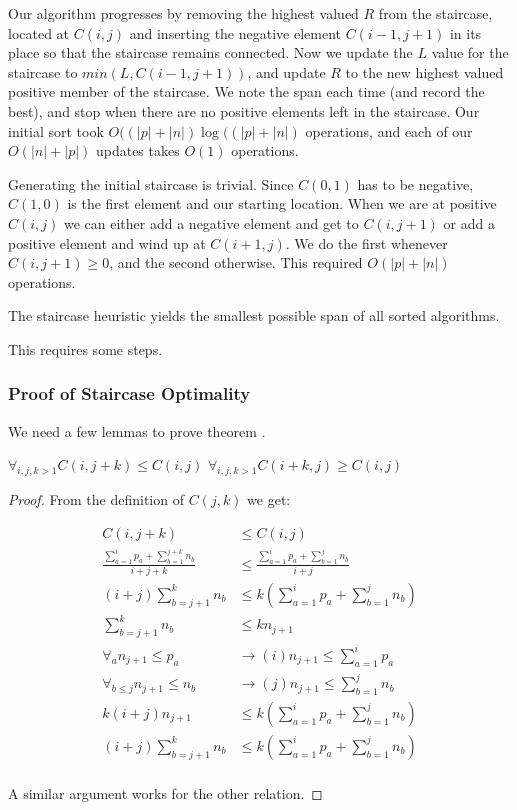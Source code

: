 \documentclass[11pt,twocolumn]{article}
\begin{document}
Our algorithm progresses by removing the highest valued $R$ from the staircase, located at $C(i,j)$ and inserting the negative element $C(i-1,j+1)$ in its place so that the staircase remains connected.  Now we update the $L$ value for the staircase to $min(L,C(i-1,j+1) )$, and update $R$ to the new highest valued positive member of the staircase. We note the span each time (and record the best), and stop when there are no positive elements left in the staircase.  Our initial sort took $O( (|p|+|n|) \log ((|p|+|n| )$ operations, and each of our $O(|n|+|p|)$ updates takes $O(1)$ operations.

Generating the initial staircase is trivial. Since $C(0,1)$ has to be negative, $C(1,0)$ is the first element and our starting location.  When we are at positive $C(i,j)$ we can either add a negative element and get to $C(i,j+1)$ or add a positive element and wind up at $C(i+1,j)$. We do the first whenever $C(i,j+1) \geq 0$, and the second otherwise. This required $O(|p|+ |n|)$ operations.

\begin{thm}  \label{thm:staircaseIsOpt}
The staircase heuristic yields the smallest possible span of all sorted algorithms.
\end{thm}

This requires some steps.

\subsubsection{Proof of Staircase Optimality}

We need a few lemmas to prove theorem \label{thm:staircaseIsOpt}.

\begin{lem} \label{lem:staircaseOrdering}
$\forall_{i,j,k>1} C(i,j+k) \leq C(i,j)$
$\forall_{i,j,k>1} C(i+k,j) \geq C(i,j)$
\end{lem}

\begin{proof}
From the definition of $C(j,k)$ we get:

\begin{align*}
C(i,j+k) &\leq C(i,j) \\
\frac{\sum_{a=1}^{i} p_a + \sum_{b=1}^{j+k} n_b }{i+j+k} &\leq \frac{\sum_{a=1}^{i} p_a + \sum_{b=1}^{j} n_b }{i+j} \\
(i+j)\sum_{b=j+1}^{k} n_b &\leq k(\sum_{a=1}^{i} p_a + \sum_{b=1}^{j} n_b) \\
\sum_{b=j+1}^{k} n_b &\leq k n_{j+1} \\
\forall_a n_{j+1} \leq p_a &\rightarrow (i) n_{j+1} \leq \sum_{a=1}^{i} p_a \\
\forall_{b\leq j} n_{j+1} \leq n_b &\rightarrow (j) n_{j+1} \leq \sum_{b=1}^{j} n_b \\
k(i+j)n_{j+1} &\leq k(\sum_{a=1}^{i} p_a + \sum_{b=1}^{j} n_b) \\  
(i+j)\sum_{b=j+1}^{k} n_b  &\leq k(\sum_{a=1}^{i} p_a + \sum_{b=1}^{j} n_b) \\  
\end{align*}

A similar argument works for the other relation.
\end{proof}
\end{document}
